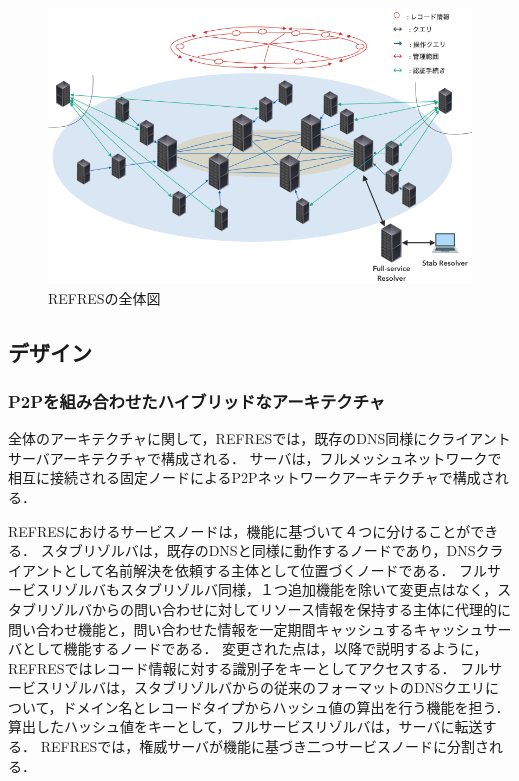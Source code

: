 \begin{figure}[t]
 \centering
 \label{fig:abstruct-REFRES-architecture}
 \includegraphics[scale=0.5]{figure/abstruct-architecture.png}
 \caption{REFRESの全体図}
\end{figure}


\subsection{デザイン}
\subsubsection{P2Pを組み合わせたハイブリッドなアーキテクチャ}
全体のアーキテクチャに関して，REFRESでは，既存のDNS同様にクライアントサーバアーキテクチャで構成される．
サーバは，フルメッシュネットワークで相互に接続される固定ノードによるP2Pネットワークアーキテクチャで構成される．

REFRESにおけるサービスノードは，機能に基づいて４つに分けることができる．
スタブリゾルバは，既存のDNSと同様に動作するノードであり，DNSクライアントとして名前解決を依頼する主体として位置づくノードである．
フルサービスリゾルバもスタブリゾルバ同様，１つ追加機能を除いて変更点はなく，スタブリゾルバからの問い合わせに対してリソース情報を保持する主体に代理的に問い合わせ機能と，問い合わせた情報を一定期間キャッシュするキャッシュサーバとして機能するノードである．
変更された点は，以降で説明するように，REFRESではレコード情報に対する識別子をキーとしてアクセスする．
フルサービスリゾルバは，スタブリゾルバからの従来のフォーマットのDNSクエリについて，ドメイン名とレコードタイプからハッシュ値の算出を行う機能を担う．
算出したハッシュ値をキーとして，フルサービスリゾルバは，サーバに転送する．
REFRESでは，権威サーバが機能に基づき二つサービスノードに分割される．

